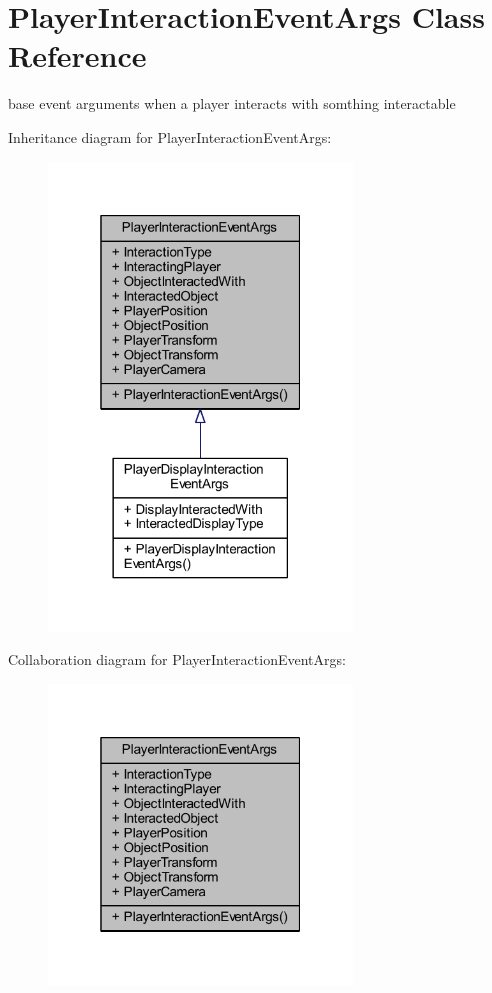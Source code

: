 \hypertarget{class_player_interaction_event_args}{}\section{Player\+Interaction\+Event\+Args Class Reference}
\label{class_player_interaction_event_args}


base event arguments when a player interacts with somthing interactable  




Inheritance diagram for Player\+Interaction\+Event\+Args\+:\nopagebreak
\begin{figure}[H]
\begin{center}
\leavevmode
\includegraphics[width=229pt]{class_player_interaction_event_args__inherit__graph}
\end{center}
\end{figure}


Collaboration diagram for Player\+Interaction\+Event\+Args\+:\nopagebreak
\begin{figure}[H]
\begin{center}
\leavevmode
\includegraphics[width=229pt]{class_player_interaction_event_args__coll__graph}
\end{center}
\end{figure}
